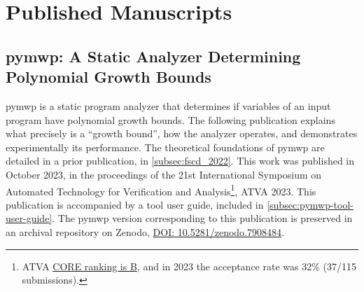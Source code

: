 \section{Published Manuscripts}\label{sec:published-manuscripts}

\pagebreak

\subsection{pymwp: A Static Analyzer Determining Polynomial Growth Bounds}
\label{subsec:pymwp}

pymwp is a static program analyzer that determines if variables of an input program have polynomial growth bounds.
The following publication explains what precisely is a \enquote{growth bound}, how the analyzer operates, and demonstrates experimentally its performance.
The theoretical foundations of pymwp are detailed in a prior publication, in \autoref{subsec:fscd_2022}.
This work was published in October 2023, in the proceedings of the 21st International Symposium on Automated Technology for Verification and Analysis\footnote{ATVA \href{https://portal.core.edu.au/conf-ranks/1357/}{CORE ranking is B}, and in 2023 the acceptance rate was 32\% (37/115 submissions).}, ATVA 2023.
This publication is accompanied by a tool user guide, included in \autoref{subsec:pymwp-tool-user-guide}.
The pymwp version corresponding to this publication is preserved in an archival repository on Zenodo, \href{https://zenodo.org/records/7908484}{DOI: 10.5281/zenodo.7908484}.

\hfill

\pagebreak

\nolinenumbers

\linenumbers
